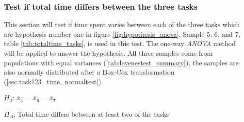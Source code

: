 \subsubsection[Sample 5, 6 and 7]{Test if total time differs between the three tasks}\label{sec:anova_result} %
This section will test if time spent varies between each of the three tasks which are hypothesis number one in figure \ref{fig:hypothesis_anova}. Sample 5, 6, and 7, table \ref{tab:totaltime_tasks}, is used in this test. The one-way \textit{ANOVA} method will be applied to answer the hypothesis. All three samples come from populations with equal variances (\ref{tab:levenestest_summary}), the samples are also normally distributed after a Box-Cox transformation (\ref{sec:task123_time_normaltest}).\\

\centerline{$H_{0}$: $\overline{x}_5$ = $\overline{x}_6$ = $\overline{x}_7$}
\centerline{$H_{A}$: Total time differs between at least two of the tasks}

